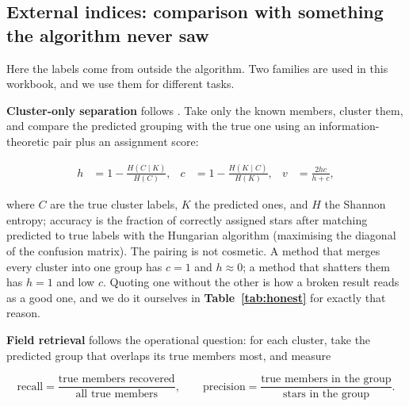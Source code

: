 \begin{marginnote}[]
\end{marginnote}

\subsection{External indices: comparison with something the algorithm never saw}

Here the labels come from outside the algorithm. Two families are used in this
workbook, and we use them for different tasks.

\textbf{Cluster-only separation} follows \citet{GarciaDias:19}. Take only the
known members, cluster them, and compare the predicted grouping with the true
one using an information-theoretic pair plus an assignment score:

\begin{align}
h &= 1 - \frac{H(C \mid K)}{H(C)}, &
c &= 1 - \frac{H(K \mid C)}{H(K)}, &
v &= \frac{2hc}{h+c},
\label{eq:merits}
\end{align}

where $C$ are the true cluster labels, $K$ the predicted ones, and $H$ the
Shannon entropy; accuracy is the fraction of correctly assigned stars after
matching predicted to true labels with the Hungarian algorithm (maximising the
diagonal of the confusion matrix). The pairing is not cosmetic. A method that
merges every cluster into one group has $c = 1$ and $h \approx 0$; a method
that shatters them has $h = 1$ and low $c$. Quoting one without the other is
how a broken result reads as a good one, and we do it ourselves in
\textbf{Table~\ref{tab:honest}} for exactly that reason.

\textbf{Field retrieval} follows the operational question: for each cluster,
take the predicted group that overlaps its true members most, and measure

\begin{equation}
\text{recall} = \frac{\text{true members recovered}}{\text{all true members}},
\qquad
\text{precision} = \frac{\text{true members in the group}}{\text{stars in the group}} .
\label{eq:rp}
\end{equation}

